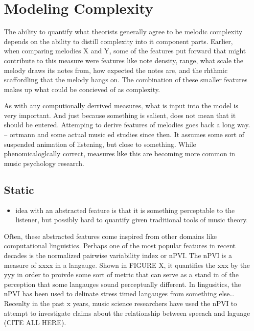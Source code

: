 \documentclass[]{book}
\providecommand{\tightlist}{%
  \setlength{\itemsep}{0pt}\setlength{\parskip}{0pt}}
\begin{document}
\hypertarget{modeling-complexity}{%
\section{Modeling Complexity}\label{modeling-complexity}}

The ability to quantify what theorists generally agree to be melodic complexity depends on the ability to distill complexity into it component parts.
Earlier, when comparing melodies X and Y, some of the features put forward that might contribute to this measure were features like note density, range, what scale the melody draws its notes from, how expected the notes are, and the rhthmic scaffordling that the melody hangs on.
The combination of these smaller features makes up what could be concieved of as complexity.

As with any computionally derrived measures, what is input into the model is very important.
And just because something is salient, does not mean that it should be entered.
Attemping to derive features of melodies goes back a long way.
-- ortmann
and some actual music ed studies since then.
It assumes some sort of suspended animation of listening, but close to something.
While phenomicaloglcally correct, measures like this are becoming more common in music psychology research.

\hypertarget{static}{%
\subsection{Static}\label{static}}

\begin{itemize}
\tightlist
\item
  idea with an abstracted feature is that it is something perceptable to the listener, but possibly hard to quantify given traditional tools of music theory.
\end{itemize}

Often, these abstracted features come inspired from other domains like computational linguistics.
Perhaps one of the most popular features in recent decades is the normalized pairwise variability index or nPVI.
The nPVI is a measure of xxxx in a langauge.
Shown in FIGURE X, it quantifies the xxx by the yyy in order to proivde some sort of metric that can serve as a stand in of the perception that some langauges sound perceptually different.
In lingusitics, the nPVI has been used to delinate stress timed langauges from something else\ldots{}
Recenlty in the past x years, music science researchers have used the nPVI to attempt to investigate claims about the relationship between speeach and laguage (CITE ALL HERE).
\end{document}
